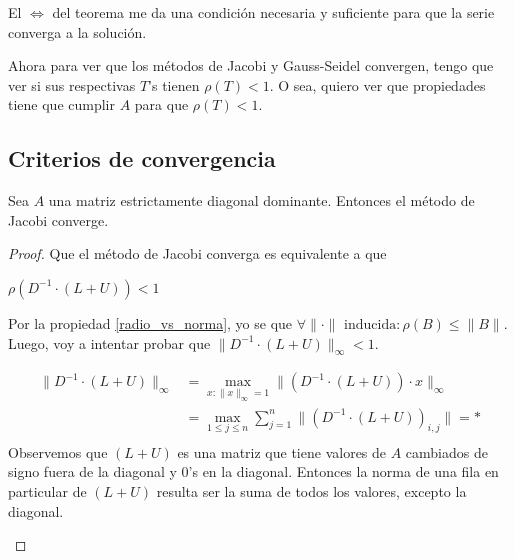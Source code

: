 \documentclass[]{article}
\begin{document}
El $\Leftrightarrow$ del teorema me da una condición necesaria y suficiente para que la serie converga a la solución.

Ahora para ver que los métodos de Jacobi y Gauss-Seidel convergen, tengo que ver si sus respectivas $T$'s tienen $\rho(T)<1$. O sea, quiero ver que propiedades tiene que cumplir $A$ para que $\rho(T)<1$.

\subsection{Criterios de convergencia}
\begin{prop}
	Sea $A$ una matriz estrictamente diagonal dominante. Entonces el método de Jacobi converge.
	\begin{proof}
		Que el método de Jacobi converga es equivalente a que
		\begin{center}
			$\rho(D^{-1}\cdot (L+U))<1$
		\end{center}

		Por la propiedad \ref{radio_vs_norma}, yo se que $\forall \|\cdot\| \text{ inducida} : \rho(B)\leq \|B\|$. Luego, voy a intentar probar que $\|D^{-1}\cdot (L+U)\|_\infty < 1$.

		\begin{align*}
			\|D^{-1}\cdot(L+U)\|_\infty &= \displaystyle \max_{x:\|x\|_\infty=1}{\|(D^{-1}\cdot(L+U))\cdot x\|_\infty}\\
			&= \max_{1\leq j\leq n}{\sum_{j=1}^{n}{\|(D^{-1}\cdot(L+U))_{i,j}\|}} = *\\
		\end{align*}
			Observemos que $(L+U)$ es una matriz que tiene valores de $A$ cambiados de signo fuera de la diagonal y 0's en la diagonal. Entonces la norma de una fila en particular de $(L+U)$ resulta ser la suma de todos los valores, excepto la diagonal.

			\begin{center}
\end{center}
\end{proof}
\end{prop}
\end{document}
